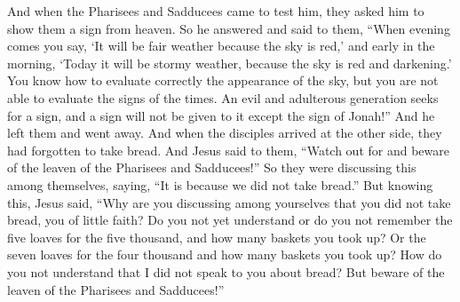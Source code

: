 \begin{biblechapter} %
 And when the Pharisees and Sadducees came to test him, they asked him to show them a sign from heaven.
\verse So he answered and said to them, “When evening comes you say, ‘It will be fair weather because the sky is red,’
\verse and early in the morning, ‘Today it will be stormy weather, because the sky is red and darkening.’ You know how to evaluate correctly the appearance of the sky, but you are not able to evaluate the signs of the times.
\verse An evil and adulterous generation seeks for a sign, and a sign will not be given to it except the sign of Jonah!” And he left them and went away.
 And when the disciples arrived at the other side, they had forgotten to take bread.
\verse And Jesus said to them, “Watch out for and beware of the leaven of the Pharisees and Sadducees!”
\verse So they were discussing this among themselves, saying, “It is because we did not take bread.”
\verse But knowing this, Jesus said, “Why are you discussing among yourselves that you did not take bread, you of little faith?
\verse Do you not yet understand or do you not remember the five loaves for the five thousand, and how many baskets you took up?
\verse Or the seven loaves for the four thousand and how many baskets you took up?
\verse How do you not understand that I did not speak to you about bread? But beware of the leaven of the Pharisees and Sadducees!”

\end{biblechapter}
